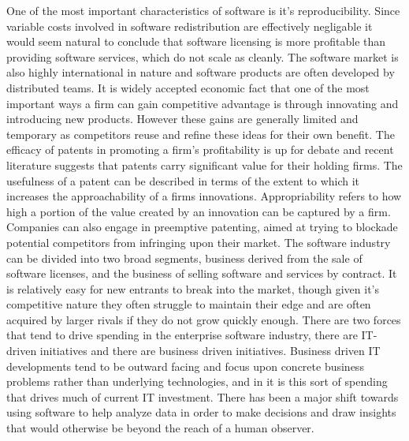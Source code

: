 One of the most important characteristics of software is it's reproducibility.\autocite[3]{buxmann2012software}
Since variable costs involved in software redistribution are effectively negligable it would seem natural to conclude that software licensing is more profitable than providing software services, which do not scale as cleanly.\autocite[3]{buxmann2012software}
The software market is also highly international in nature and software products are often developed by distributed teams.\autocite[3]{buxmann2012software}
It is widely accepted economic fact that one of the most important ways a firm can gain competitive advantage is through innovating and introducing new products. However these gains are generally limited and temporary as competitors reuse and refine these ideas for their own benefit.\autocite[81]{ceccagnoli2007appropriability}
The efficacy of patents in promoting a firm's profitability is up for debate and recent literature suggests that patents carry significant value for their holding firms.\autocite[]{ceccagnoli2007appropriability}
The usefulness of a patent can be described in terms of the extent to which it increases the approachability of a firms innovations.\autocite[81]{ceccagnoli2007appropriability}
Appropriability refers to how high a portion of the value created by an innovation can be captured by a firm.\autocite[82]{ceccagnoli2007appropriability}
Companies can also engage in preemptive patenting, aimed at trying to blockade potential competitors from infringing upon their market.\autocite[83]{ceccagnoli2007appropriability}
The software industry can be divided into two broad segments, business derived from the sale of software licenses, and the business of selling software and services by contract.\autocite[]{ValuelineOverview}
It is relatively easy for new entrants to break into the market, though given it's competitive nature they often struggle to maintain their edge and are often acquired by larger rivals if they do not grow quickly enough.\autocite[]{ValuelineOverview}
There are two forces that tend to drive spending in the enterprise software industry, there are IT-driven initiatives and there are business driven initiatives.\autocite[]{NextGenBusinessSoftware}
Business driven IT developments tend to be outward facing and focus upon concrete business problems rather than underlying technologies, and in it is this sort of spending that drives much of current IT investment.\autocite[]{NextGenBusinessSoftware}
There has been a major shift towards using software to help analyze data in order to make decisions and draw insights that would otherwise be beyond the reach of a human observer.\autocite[]{NextGenBusinessSoftware}
